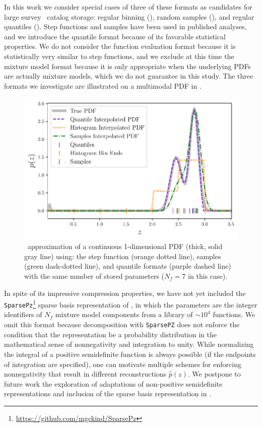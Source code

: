 In this work we consider special cases of three of these formats as candidates 
for large survey \pz\ catalog storage: regular binning 
(), random samples (), and 
regular quantiles ().
Step functions and samples have been used in published analyses, and we 
introduce the quantile format because of its favorable statistical properties.
We do not consider the function evaluation format because it is statistically 
very similar to step functions, and we exclude at this time the mixture model 
format because it is only appropriate when the underlying PDFs are actually 
mixture models, which we do not guarantee in this study.
The three formats we investigate are illustrated on a multimodal PDF in 
.
\begin{figure}
	\begin{center}
		\includegraphics[width=0.66\columnwidth]{figures/qp/demo_pz.pdf}
		\caption{\qp\ approximation of a continuous 1-dimensional PDF (thick, solid 
			gray line) using: the step function (orange dotted line), samples (green 
			dash-dotted line), and quantile formats (purple dashed line) with the same 
			number of stored parameters ($N_{f}=7$ in this case).
			}
	\end{center}
\end{figure}

In spite of its impressive compression properties, we have not yet included the 
\texttt{SparsePz}\footnote{\url{https://github.com/mgckind/SparsePz}} sparse 
basis representation of \citet{carrasco_kind_sparse_2014}, in which the 
parameters are the integer identifiers of $N_{f}$ mixture model components from 
a library of $\sim10^{4}$ functions.
We omit this format because decomposition with \texttt{SparsePZ} does not 
enforce the condition that the representation be a probability distribution in 
the mathematical sense of nonnegativity and integration to unity.
While normalizing the integral of a positive semidefinite function is always 
possible (if the endpoints of integration are specified), one can motivate 
multiple schemes for enforcing nonnegativity that result in different 
reconstructions $\hat{p}(z)$.
We postpone to future work the exploration of adaptations of non-positive 
semidefinite representations and inclusion of the sparse basis representation 
in \qp.

